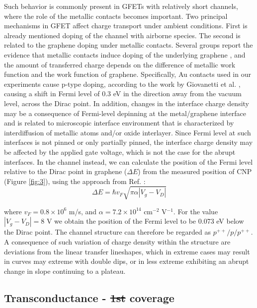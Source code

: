 \documentclass[preprint,aip,jap]{revtex4-2}
\providecommand{\DIFadd}[1]{{\protect\color{blue}\uwave{#1}}} %
\providecommand{\DIFdel}[1]{{\protect\color{red}\sout{#1}}}                      %
\providecommand{\DIFaddbegin}{} %
\providecommand{\DIFaddend}{} %
\providecommand{\DIFdelbegin}{} %
\providecommand{\DIFdelend}{} %
\newcommand{\DIFscaledelfig}{0.5}
\newlength{\DIFdelgraphicswidth} %
\newlength{\DIFdelgraphicsheight} %
\newcommand{\DIFaddincludegraphics}[2][]{{\color{blue}\fbox{\DIFOincludegraphics[#1]{#2}}}} %
\newcommand{\DIFdelincludegraphics}[2][]{%
\sbox{\DIFdelgraphicsbox}{\DIFOincludegraphics[#1]{#2}}%
\settoboxwidth{\DIFdelgraphicswidth}{\DIFdelgraphicsbox} %
\settoboxtotalheight{\DIFdelgraphicsheight}{\DIFdelgraphicsbox} %
\scalebox{\DIFscaledelfig}{%
\parbox[b]{\DIFdelgraphicswidth}{\usebox{\DIFdelgraphicsbox}\\[-\baselineskip] \rule{\DIFdelgraphicswidth}{0em}}\llap{\resizebox{\DIFdelgraphicswidth}{\DIFdelgraphicsheight}{%
\setlength{\unitlength}{\DIFdelgraphicswidth}%
\begin{picture}(1,1)%
\thicklines\linethickness{2pt} %
{\color[rgb]{1,0,0}\put(0,0){\framebox(1,1){}}}%
{\color[rgb]{1,0,0}\put(0,0){\line( 1,1){1}}}%
{\color[rgb]{1,0,0}\put(0,1){\line(1,-1){1}}}%
\end{picture}%
}\hspace*{3pt}}} %
} %
\DeclareRobustCommand{\DIFaddbegin}{\DIFOaddbegin \let\includegraphics\DIFaddincludegraphics} %
\DeclareRobustCommand{\DIFaddend}{\DIFOaddend \let\includegraphics\DIFOincludegraphics} %
\DeclareRobustCommand{\DIFdelbegin}{\DIFOdelbegin \let\includegraphics\DIFdelincludegraphics} %
\DeclareRobustCommand{\DIFdelend}{\DIFOaddend \let\includegraphics\DIFOincludegraphics} %
\begin{document}
  Such behavior is commonly present in GFETs with relatively short channels, where the role of the metallic contacts becomes important\cite{bartolomeo-2015,nouchi-2008,nouchi-2014}.
 Two principal mechanisms in GFET affect charge transport under ambient conditions.
 First is already mentioned doping of the channel with airborne species.
 The second is related to the graphene doping under metallic contacts\cite{farmer-2009,giovannetti-2008,lee-2008,mueller-2009}.
  Several groups report the evidence that metallic contacts induce doping of the underlying graphene \cite{giovannetti-2008,mueller-2009,huard-2008}, and the amount of transferred charge depends on the difference of metallic work function and the work function of graphene.
  Specifically, Au contacts used in our experiments cause p-type doping, according to the work by Giovanetti et al.
\cite{giovannetti-2008}, causing a shift in Fermi level of 0.3 eV in the direction away from the vacuum level, across the Dirac point.
 In addition, changes in the interface charge density may be a consequence of Fermi-level depinning at the metal/graphene interface and is related to microscopic interface environment that is characterized by interdiffusion of metallic atoms and/or oxide interlayer\cite{nouchi-2008,nouchi-2014}.
 Since Fermi level at such interfaces is not pinned or only partially pinned\cite{dibartolomeo-2011}, the interface charge density may be affected by the applied gate voltage, which is not the case for the abrupt interfaces.
  In the channel instead, we can calculate the position of the Fermi level relative to the Dirac point in graphene ($\Delta E$) from the measured position of CNP (Figure \ref{fig:3}), using the approach from Ref.
 :
\begin{equation}
  \label{eq:1}
  \Delta E = \hbar v_{F}\sqrt{\pi\alpha|V_{g}-V_{D}|}
\end{equation}

where $v_F=0.
8\times10^6$ m/s, and $\alpha=7.
2\times10^{14}$ cm$^{-2}$ V$^{-1}$.
 For the value $|V_g-V_D |=8$ V we obtain the position of the Fermi level to be 0.073 eV below the Dirac point.
 The channel structure can therefore be regarded as $p^{++}/p/p^{++}$.
 A consequence of such variation of charge density within the structure are deviations from the linear transfer lineshapes, which in extreme cases may result in curves may extreme with double dips\cite{nouchi-2014,nam-2012}, or in less extreme exhibiting an abrupt change in slope continuing to a plateau.


\subsection{Transconductance - \DIFdelbegin \DIFdel{1st }\DIFdelend \DIFaddbegin \DIFadd{submonolayer }\DIFaddend coverage}
\label{sec:first}
\end{document}
